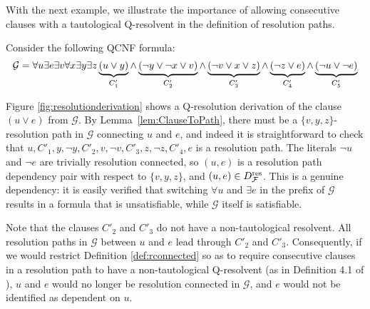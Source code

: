 \documentclass{llncs}
\newcommand{\longversion}[1]{#1}
\newcommand{\shortversion}[1]{}
\newcommand{\GGG}{\mathcal{G}} \newcommand{\HHH}{\mathcal{H}}
\newcommand{\Dres}{D^{\text{\normalfont res}}}
\def\hy{\hbox{-}\nobreak\hskip0pt} \newcommand{\ellipsis}{$\dots$}
\begin{document}
With the next example, we illustrate the importance of allowing consecutive
clauses with a tautological Q\hy resolvent in the definition of resolution
paths.
\begin{example}\label{ex:nontaut} \longversion{Consider the following QCNF formula:
  \[ \GGG = \forall u \exists e \exists v \forall x \exists y \exists z
  \underbrace{(u \vee y)}_{C'_1} \wedge \underbrace{(\neg y \vee \neg x \vee
    v)}_{C'_2} \wedge\hskip 0pt \underbrace{(\neg v \vee x \vee z)}_{C'_3}
  \wedge \underbrace{(\neg z \vee e)}_{C'_4} \wedge \underbrace{(\neg u \vee
    \neg e)}_{C'_5} \]}
\shortversion{Let $\GGG = \forall u \exists e \exists v \forall x \exists y
  \exists z \:C'_1 \wedge C'_2 \wedge C'_3 \wedge C'_4 \wedge C'_5$, where
  $C'_1 = (u \vee y)$, $C'_2 = (\neg y \vee \neg x \vee v)$, $C'_3 = (\neg v
  \vee x \vee z)$, $C'_4 = (\neg z \vee e)$, and $C'_5 = (\neg u \vee \neg
  e)$.}
 Figure \ref{fig:resolutionderivation} shows a Q\hy resolution
derivation of the clause $(u \vee e)$ from $\GGG$. By
Lemma~\ref{lem:ClauseToPath}, there must be a $\{v,y,z\}$-resolution path in
$\GGG$ connecting $u$ and $e$, and indeed it is straightforward to check that
$u,C'_1,y,\neg y,C'_2,v,\neg v, C'_3, z,\neg z, C'_4, e$ is a resolution
path. The literals $\neg u$ and $\neg e$ are trivially resolution connected,
so $(u,e)$ is a resolution path dependency pair with respect to $\{v,y,z\}$,
and $(u,e) \in \Dres_{\FFF}$. This is a genuine dependency: it is easily
verified that switching $\forall u$ and $\exists e$ in the prefix of $\GGG$
results in a formula that is unsatisfiable, while $\GGG$ itself is
satisfiable.

  Note that the clauses $C'_2$ and $C'_3$ do not have a non\hy tautological
  resolvent. All resolution paths in $\GGG$ between $u$ and $e$ lead through
  $C'_2$ and $C'_3$. Consequently, if we would restrict Definition
  \ref{def:rconnected} so as to require consecutive clauses in a resolution
  path to have a non\hy tautological Q\hy resolvent (as in Definition 4.1 of
  \cite{VanGelder11}), $u$ and $e$ would no longer be resolution connected in
  $\GGG$, and $e$ would not be identified as dependent on $u$.
\end{example}
\end{document}
